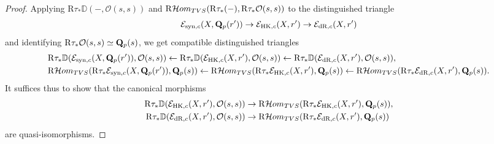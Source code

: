\documentclass[10pt,reqno]{amsart}
\let\cal\mathcal
\theoremstyle{definition}
\theoremstyle{remark}
\newcommand{\dr}{\operatorname{dR} }
\newcommand{\Hhom}{{\cal Hom}}
\newcommand{\synt}{ \operatorname{syn} }
\newcommand{\hk}{\operatorname{HK} }
\newcommand{\so}{{\mathcal O}}
\newcommand{\se}{{\mathcal{E}}}
\numberwithin{equation}{section}
\def\R{{\mathrm R}}
\def\Q{{\bf Q}} \def\Z{{\bf Z}}
\numberwithin{equation}{section}
\begin{document}
\begin{proof}
     Applying $ \R\tau_{*}{\mathbb D}(-,\so(s,s))$ and  $ \R\Hhom_{\rm TVS}(\R\tau_*(-),\R\tau_*\so(s,s))$  to the distinguished triangle 
    \begin{equation}\label{def11} 
\se_{\synt,c}(X,\Q_p(r^{\prime}))\to\se_{\hk,c}(X,r^{\prime})\to \se_{\dr,c}(X,r^{\prime})
\end{equation}
and identifying $\R\tau_*\so(s,s)\simeq \Q_p(s)$, 
   we get compatible  distinguished triangles
\begin{align*}\label{triangle1}
& \R\tau_{*}{\mathbb D}(\se_{\synt,c}(X,\Q_p(r^{\prime})),\so(s,s))\leftarrow  \R\tau_{*}{\mathbb D}(\se_{\hk,c}(X,r^{\prime}),\so(s,s))\leftarrow 
  \R\tau_{*} {\mathbb D}(\se_{\dr,c}(X,r^{\prime}),\so(s,s)),\\
&\R\Hhom_{\rm TVS}(\R\tau_*\se_{\synt,c}(X,\Q_p(r^{\prime})),\Q_p(s))\leftarrow  \R\Hhom_{\rm TVS}(\R\tau_{*}\se_{\hk,c}(X,r^{\prime}),\Q_p(s))
\leftarrow \R\Hhom_{\rm TVS}(\R\tau_{*}\se_{\dr,c}(X,r^{\prime}),\Q_p(s)).
\end{align*}
It suffices thus to show that the canonical morphisms
\begin{align*}
   \R\tau_{*} {\mathbb D}(\se_{\hk,c}(X,r^{\prime}),\so(s,s))& \to  \R\Hhom_{\rm TVS}(\R\tau_{*}\se_{\hk,c}(X,r^{\prime}),\Q_p(s)),\\
  \R\tau_{*}{\mathbb D}(\se_{\dr,c}(X,r^{\prime}),\so(s,s))& \to  \R\Hhom_{\rm TVS}(\R\tau_{*}\se_{\dr,c}(X,r^{\prime}),\Q_p(s))
\end{align*}
are quasi-isomorphisms. 


\end{proof}
\end{document}
